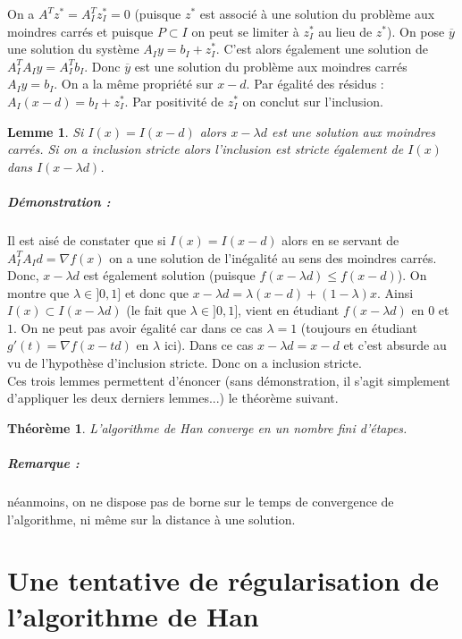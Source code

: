 \documentclass[10pt,a4paper]{article}
\newtheorem{thm}{Théorème}
\newtheorem{lemma}{Lemme}
\begin{document}
On a $A^T z^* =A_I^T z_I^* =0$ (puisque $z^*$ est associé à une solution du problème aux moindres carrés et puisque $P \subset I$ on peut se limiter à $z_I^*$ au lieu de $z^*$).
On pose $\overline{y}$ une solution du système $A_Iy=b_I+z_I^*$.  C'est alors également une solution de $A_I^TA_Iy=A_I^Tb_I$.
Donc $\overline{y}$ est une solution du problème aux moindres carrés $A_Iy=b_I$.
On a la même propriété sur $x-d$.
Par égalité des résidus : $A_I(x-d)=b_I+z_I^*$.
Par positivité de $z_I^*$ on conclut sur l'inclusion.
\begin{lemma}
Si $I(x)=I(x-d)$ alors $x-\lambda d$ est une solution aux moindres carrés.
Si on a inclusion stricte alors l'inclusion est stricte également de $I(x)$ dans $I(x-\lambda d)$.
\end{lemma}
\subparagraph{Démonstration :} Il est aisé de constater que si $I(x)=I(x-d)$ alors en se servant de $A_I^TA_I d= \nabla f(x)$ on a une solution de l'inégalité au sens des moindres carrés.
Donc, $x-\lambda d$ est également solution (puisque $f(x-\lambda d) \le f(x-d)$).
On montre que $\lambda \in ]0,1]$ et donc que $x-\lambda d= \lambda (x-d) +(1-\lambda) x$.
Ainsi $I(x) \subset I(x -\lambda d)$ (le fait que $\lambda \in ]0,1]$, vient en étudiant $f(x-\lambda d)$ en $0$ et $1$.
On ne peut pas avoir égalité car dans ce cas $\lambda=1$ (toujours en étudiant $g'(t)=\nabla f(x-td)$ en $\lambda$ ici).
Dans ce cas $x-\lambda d =x- d$ et c'est absurde au vu de l'hypothèse d'inclusion stricte.
Donc on a inclusion stricte.\\
Ces trois lemmes permettent d'énoncer (sans démonstration, il s'agit simplement d'appliquer les deux derniers lemmes...) le théorème suivant.
\begin{thm}
L'algorithme de Han converge en un nombre fini d'étapes.
\end{thm}
\subparagraph{Remarque :} néanmoins, on ne dispose pas de borne sur le temps de convergence de l'algorithme, ni même sur la distance à une solution.

\section{Une tentative de régularisation de l'algorithme de Han}
\end{document}
